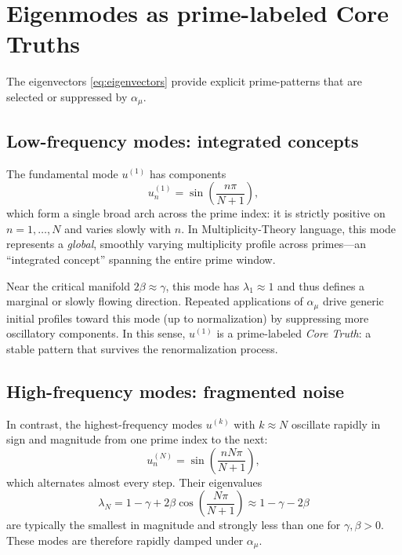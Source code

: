 \documentclass[11pt]{article}
\begin{document}
\section{Eigenmodes as prime-labeled Core Truths}

The eigenvectors \eqref{eq:eigenvectors} provide explicit prime-patterns that are selected or suppressed by $\alpha_\mu$.

\subsection{Low-frequency modes: integrated concepts}

The fundamental mode $u^{(1)}$ has components
\begin{equation}
    u^{(1)}_n = \sin\left(\frac{n\pi}{N+1}\right),
\end{equation}
which form a single broad arch across the prime index: it is strictly positive on $n=1,\dots,N$ and varies slowly with $n$.
In Multiplicity-Theory language, this mode represents a \emph{global}, smoothly varying multiplicity profile across primes---an ``integrated concept'' spanning the entire prime window.

Near the critical manifold $2\beta \approx \gamma$, this mode has $\lambda_1 \approx 1$ and thus defines a marginal or slowly flowing direction.
Repeated applications of $\alpha_\mu$ drive generic initial profiles toward this mode (up to normalization) by suppressing more oscillatory components.
In this sense, $u^{(1)}$ is a prime-labeled \emph{Core Truth}: a stable pattern that survives the renormalization process.

\subsection{High-frequency modes: fragmented noise}

In contrast, the highest-frequency modes $u^{(k)}$ with $k \approx N$ oscillate rapidly in sign and magnitude from one prime index to the next:
\begin{equation}
    u^{(N)}_n = \sin\left(\frac{n N \pi}{N+1}\right),
\end{equation}
which alternates almost every step.
Their eigenvalues
\begin{equation}
    \lambda_N = 1 - \gamma + 2\beta \cos\left(\frac{N\pi}{N+1}\right) \approx 1 - \gamma - 2\beta
\end{equation}
are typically the smallest in magnitude and strongly less than one for $\gamma,\beta > 0$.
These modes are therefore rapidly damped under $\alpha_\mu$.
\end{document}
